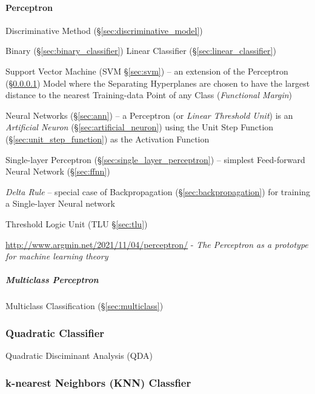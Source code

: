 \paragraph{Perceptron}\label{sec:perceptron}\hfill

Discriminative Method (\S\ref{sec:discriminative_model})

Binary (\S\ref{sec:binary_classifier}) Linear Classifier
(\S\ref{sec:linear_classifier})

\fist Support Vector Machine (SVM \S\ref{sec:svm}) -- an extension of the
Perceptron (\S\ref{sec:perceptron}) Model where the Separating Hyperplanes are
chosen to have the largest distance to the nearest Training-data Point of any
Class (\emph{Functional Margin})

\fist Neural Networks (\S\ref{sec:ann}) -- a Perceptron (or \emph{Linear
  Threshold Unit}) is an \emph{Artificial Neuron}
(\S\ref{sec:artificial_neuron}) using the Unit Step Function
(\S\ref{sec:unit_step_function}) as the Activation Function

\fist Single-layer Perceptron (\S\ref{sec:single_layer_perceptron})
-- simplest Feed-forward Neural Network (\S\ref{sec:ffnn})

\emph{Delta Rule} -- special case of Backpropagation
(\S\ref{sec:backpropagation}) for training a Single-layer Neural network

\fist Threshold Logic Unit (TLU \S\ref{sec:tlu})

\url{http://www.argmin.net/2021/11/04/perceptron/} -
\emph{The Perceptron as a prototype for machine learning theory}



\subparagraph{Multiclass Perceptron}\label{sec:multiclass_perceptron}\hfill

\fist Multiclass Classification (\S\ref{sec:multiclass})



\subsubsection{Quadratic Classifier}\label{sec:quadratic_classifier}

Quadratic Disciminant Analysis (QDA)



\subsubsection{k-nearest Neighbors (KNN) Classfier}\label{sec:knn_classifier}

